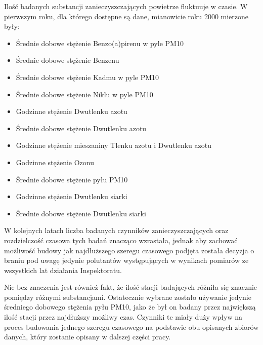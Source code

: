 \documentclass[10pt,a4paper]{article}
\begin{document}
Ilość badanych substancji zanieczyszczających powietrze fluktuuje w czasie. W pierwszym roku, dla którego dostępne są dane, mianowicie roku 2000 mierzone były:
\begin{itemize}
	\item Średnie dobowe stężenie Benzo(a)pirenu w pyle PM10
	\item Średnie dobowe stężenie Benzenu
	\item Średnie dobowe stężenie Kadmu w pyle PM10 
	\item Średnie dobowe stężenie Niklu w pyle PM10
	\item Godzinne stężenie Dwutlenku azotu
	\item Średnie dobowe stężenie Dwutlenku azotu
	\item Godzinne stężenie mieszaniny Tlenku azotu i Dwutlenku azotu
	\item Godzinne stężenie Ozonu
	\item Średnie dobowe stężenie pyłu PM10
	\item Godzinne stężenie Dwutlenku siarki
	\item Średnie dobowe stężenie Dwutlenku siarki
\end{itemize}
W kolejnych latach liczba badanych czynników zanieczyszczających oraz rozdzielczość czasowa tych badań znacząco wzrastała, jednak aby zachować możliwość budowy jak najdłuższego szeregu czasowego podjęta została decyzja o braniu pod uwagę jedynie polutantów występujących w wynikach pomiarów ze wszystkich lat działania Inspektoratu. 


Nie bez znaczenia jest również fakt, że ilość stacji badających różniła się znacznie pomiędzy różnymi substancjami. Ostatecznie wybrane zostało używanie jedynie średniego dobowego stężenia pyłu PM10, jako że był on badany przez największą ilość stacji przez najdłuższy możliwy czas. Czynniki te miały duży wpływ na proces budowania jednego szeregu czasowego na podstawie obu opisanych zbiorów danych, który zostanie opisany w dalszej części pracy.
\end{document}
